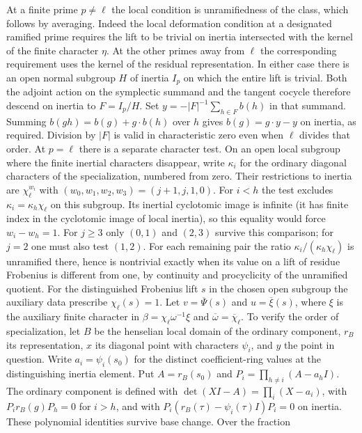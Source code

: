 \documentclass[11pt]{amsart}
\theoremstyle{definition}
\theoremstyle{remark}
\begin{document}
At a finite prime $p\ne\ell$ the local condition is
unramifiedness of the class, which follows by averaging. Indeed the
local deformation condition at a designated ramified prime requires
the lift to be trivial on inertia intersected with the kernel of the
finite character $\eta$. At the other primes away from $\ell$ the
corresponding requirement uses the kernel of the residual
representation. In either case there is an open normal subgroup
$H$ of inertia $I_p$ on which the entire lift is trivial. Both the
adjoint action on the symplectic summand and the tangent cocycle
therefore descend on inertia to $F=I_p/H$. Set
$y=-|F|^{-1}\sum_{h\in F} b(h)$ in that summand. Summing
$b(gh)=b(g)+g\cdot b(h)$ over $h$ gives $b(g)=g\cdot y-y$ on
inertia, as required. Division by $|F|$ is valid in characteristic
zero even when $\ell$ divides that order. At $p=\ell$ there is a separate character test. On an open
local subgroup where the finite inertial characters disappear, write
$\kappa_i$ for the ordinary diagonal characters of the specialization,
numbered from zero. Their restrictions to inertia are
$\chi_\ell^{w_i}$ with $(w_0,w_1,w_2,w_3)=(j+1,j,1,0)$.
For $i<h$ the test excludes $\kappa_i=\kappa_h\chi_\ell$ on
this subgroup. Its inertial cyclotomic image is infinite (it has
finite index in the cyclotomic image of local inertia), so this
equality would force $w_i-w_h=1$. For $j\ge3$ only $(0,1)$ and
$(2,3)$ survive this comparison; for $j=2$ one must also test
$(1,2)$. For each remaining pair the ratio
$\kappa_i/(\kappa_h\chi_\ell)$ is unramified there, hence is
nontrivial exactly when its value on a lift of residue Frobenius
is different from one, by continuity and procyclicity of the
unramified quotient. For the distinguished Frobenius lift $s$ in the chosen
open subgroup the auxiliary data prescribe $\chi_\ell(s)=1$.
Let $v=\overline\Psi(s)$ and $u=\overline\xi(s)$, where $\xi$
is the auxiliary finite character in
$\beta=\chi_\ell\omega^{-1}\xi$ and $\overline\omega=
\overline\chi_\ell$. To verify the order of specialization, let $B$ be the henselian local
domain of the ordinary component, $r_B$ its representation, $x$ its
diagonal point with characters $\psi_i$, and $y$ the point in question.
Write $a_i=\psi_i(s_0)$ for the distinct coefficient-ring values at
the distinguishing inertia element. Put $A=r_B(s_0)$ and
$P_i=\prod_{h\ne i}(A-a_h I)$. The ordinary component is defined
with $\det(XI-A)=\prod_i(X-a_i)$, with $P_i r_B(g)P_h=0$ for
$i>h$, and with $P_i(r_B(\tau)-\psi_i(\tau)I)P_i=0$ on inertia.
These polynomial identities survive base change. Over the fraction
\end{document}

